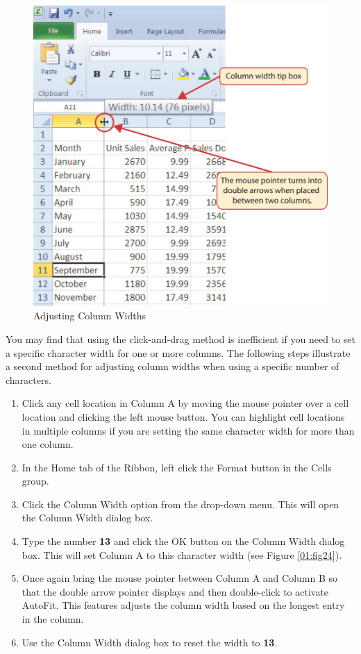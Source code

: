 \begin{figure}[H]
	\centering
	\includegraphics[width=\maxwidth{.95\linewidth}]{gfx/ch01_fig23}
	\caption{Adjusting Column Widths}
	\label{01:fig23}
\end{figure}

You may find that using the click-and-drag method is inefficient if you need to set a specific character width for one or more columns. The following steps illustrate a second method for adjusting column widths when using a specific number of characters.

\begin{enumerate}
	\item Click any cell location in Column \textsf{A} by moving the mouse pointer over a cell location and clicking the left mouse button. You can highlight cell locations in multiple columns if you are setting the same character width for more than one column.
	\item In the Home tab of the Ribbon, left click the Format button in the Cells group.
	\item Click the Column Width option from the drop-down menu. This will open the Column Width dialog box.
	\item Type the number \textbf{13} and click the OK button on the Column Width dialog box. This will set Column \textsf{A} to this character width (see Figure \ref{01:fig24}).
	\item Once again bring the mouse pointer between Column \textsf{A} and Column \textsf{B} so that the double arrow pointer displays and then double-click to activate AutoFit. This features adjusts the column width based on the longest entry in the column.
	\item Use the Column Width dialog box to reset the width to \textbf{13}.
\end{enumerate}

